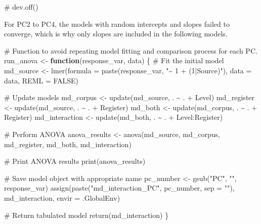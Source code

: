 \documentclass[
  letterpaper,
  DIV=11,
  numbers=noendperiod]{scrreprt}
\newenvironment{Shaded}{\begin{snugshade}}{\end{snugshade}}
\newcommand{\AttributeTok}[1]{\textcolor[rgb]{0.40,0.45,0.13}{#1}}
\newcommand{\CommentTok}[1]{\textcolor[rgb]{0.37,0.37,0.37}{#1}}
\newcommand{\ConstantTok}[1]{\textcolor[rgb]{0.56,0.35,0.01}{#1}}
\newcommand{\ControlFlowTok}[1]{\textcolor[rgb]{0.00,0.23,0.31}{\textbf{#1}}}
\newcommand{\FunctionTok}[1]{\textcolor[rgb]{0.28,0.35,0.67}{#1}}
\newcommand{\NormalTok}[1]{\textcolor[rgb]{0.00,0.23,0.31}{#1}}
\newcommand{\OtherTok}[1]{\textcolor[rgb]{0.00,0.23,0.31}{#1}}
\newcommand{\SpecialCharTok}[1]{\textcolor[rgb]{0.37,0.37,0.37}{#1}}
\newcommand{\StringTok}[1]{\textcolor[rgb]{0.13,0.47,0.30}{#1}}
\begin{document}
\begin{Shaded}
\begin{Highlighting}[]
\CommentTok{\# dev.off()}
\end{Highlighting}
\end{Shaded}

For PC2 to PC4, the models with random intercepts and slopes failed to
converge, which is why only slopes are included in the following models.

\begin{Shaded}
\begin{Highlighting}[]
\CommentTok{\# Function to avoid repeating model fitting and comparison process for each PC.}
\NormalTok{run\_anova }\OtherTok{\textless{}{-}} \ControlFlowTok{function}\NormalTok{(response\_var, data) \{}
  \CommentTok{\# Fit the initial model}
\NormalTok{  md\_source }\OtherTok{\textless{}{-}} \FunctionTok{lmer}\NormalTok{(}\AttributeTok{formula =} \FunctionTok{paste}\NormalTok{(response\_var, }\StringTok{"\textasciitilde{} 1 + (1|Source)"}\NormalTok{), }\AttributeTok{data =}\NormalTok{ data, }\AttributeTok{REML =} \ConstantTok{FALSE}\NormalTok{)}
  
  \CommentTok{\# Update models}
\NormalTok{  md\_corpus }\OtherTok{\textless{}{-}} \FunctionTok{update}\NormalTok{(md\_source, . }\SpecialCharTok{\textasciitilde{}}\NormalTok{ . }\SpecialCharTok{+}\NormalTok{ Level)}
\NormalTok{  md\_register }\OtherTok{\textless{}{-}} \FunctionTok{update}\NormalTok{(md\_source, . }\SpecialCharTok{\textasciitilde{}}\NormalTok{ . }\SpecialCharTok{+}\NormalTok{ Register)}
\NormalTok{  md\_both }\OtherTok{\textless{}{-}} \FunctionTok{update}\NormalTok{(md\_corpus, . }\SpecialCharTok{\textasciitilde{}}\NormalTok{ . }\SpecialCharTok{+}\NormalTok{ Register)}
\NormalTok{  md\_interaction }\OtherTok{\textless{}{-}} \FunctionTok{update}\NormalTok{(md\_both, . }\SpecialCharTok{\textasciitilde{}}\NormalTok{ . }\SpecialCharTok{+}\NormalTok{ Level}\SpecialCharTok{:}\NormalTok{Register)}
  
  \CommentTok{\# Perform ANOVA}
\NormalTok{  anova\_results }\OtherTok{\textless{}{-}} \FunctionTok{anova}\NormalTok{(md\_source, md\_corpus, md\_register, md\_both, md\_interaction)}
  
  \CommentTok{\# Print ANOVA results}
  \FunctionTok{print}\NormalTok{(anova\_results)}
  
  \CommentTok{\# Save model object with appropriate name}
\NormalTok{  pc\_number }\OtherTok{\textless{}{-}} \FunctionTok{gsub}\NormalTok{(}\StringTok{"PC"}\NormalTok{, }\StringTok{""}\NormalTok{, response\_var)}
  \FunctionTok{assign}\NormalTok{(}\FunctionTok{paste}\NormalTok{(}\StringTok{"md\_interaction\_PC"}\NormalTok{, pc\_number, }\AttributeTok{sep =} \StringTok{""}\NormalTok{), md\_interaction, }\AttributeTok{envir =}\NormalTok{ .GlobalEnv)}
  
  \CommentTok{\# Return tabulated model}
  \FunctionTok{return}\NormalTok{(md\_interaction)}
\NormalTok{\}}
\end{Highlighting}
\end{Shaded}
\end{document}
